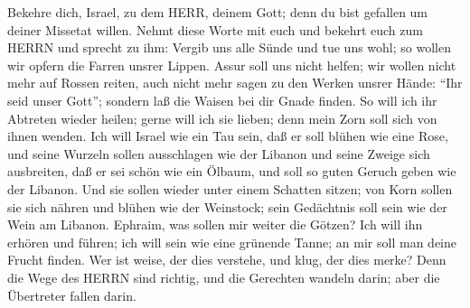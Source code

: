 Bekehre dich, Israel, zu dem HERR, deinem Gott; denn du
bist gefallen um deiner Missetat willen.  Nehmt diese Worte
mit euch und bekehrt euch zum HERRN und sprecht zu ihm: Vergib uns alle
Sünde und tue uns wohl; so wollen wir opfern die Farren unsrer Lippen.
 Assur soll uns nicht helfen; wir wollen nicht mehr auf
Rossen reiten, auch nicht mehr sagen zu den Werken unsrer Hände: ``Ihr
seid unser Gott''; sondern laß die Waisen bei dir Gnade finden.
 So will ich ihr Abtreten wieder heilen; gerne will ich sie
lieben; denn mein Zorn soll sich von ihnen wenden.  Ich will
Israel wie ein Tau sein, daß er soll blühen wie eine Rose, und seine
Wurzeln sollen ausschlagen wie der Libanon  und seine Zweige
sich ausbreiten, daß er sei schön wie ein Ölbaum, und soll so guten
Geruch geben wie der Libanon.  Und sie sollen wieder unter
einem Schatten sitzen; von Korn sollen sie sich nähren und blühen wie
der Weinstock; sein Gedächtnis soll sein wie der Wein am Libanon.
 Ephraim, was sollen mir weiter die Götzen? Ich will ihn
erhören und führen; ich will sein wie eine grünende Tanne; an mir soll
man deine Frucht finden.  Wer ist weise, der dies verstehe,
und klug, der dies merke? Denn die Wege des HERRN sind richtig, und die
Gerechten wandeln darin; aber die Übertreter fallen darin.

